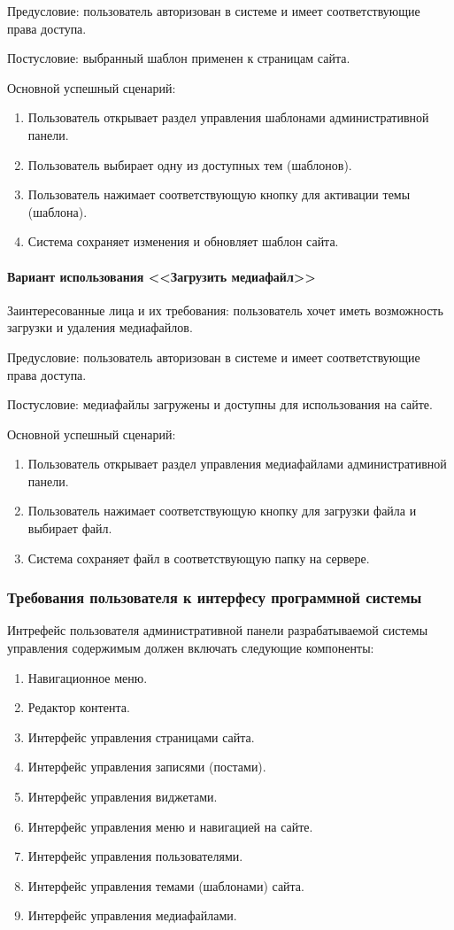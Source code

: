 Предусловие: пользователь авторизован в системе и имеет соответствующие права доступа.

Постусловие: выбранный шаблон применен к страницам сайта.

Основной успешный сценарий:
\begin{enumerate}
	\item Пользователь открывает раздел управления шаблонами административной панели.
	\item Пользователь выбирает одну из доступных тем (шаблонов).
	\item Пользователь нажимает соответствующую кнопку для активации темы (шаблона).
	\item Система сохраняет изменения и обновляет шаблон сайта.
\end{enumerate}

\paragraph{Вариант использования <<Загрузить медиафайл>>}
Заинтересованные лица и их требования: пользователь хочет иметь возможность загрузки и удаления медиафайлов.

Предусловие: пользователь авторизован в системе и имеет соответствующие права доступа.

Постусловие: медиафайлы загружены и доступны для использования на сайте.

Основной успешный сценарий:
\begin{enumerate}
	\item Пользователь открывает раздел управления медиафайлами административной панели.
	\item Пользователь нажимает соответствующую кнопку для загрузки файла и выбирает файл.
	\item Система сохраняет файл в соответствующую папку на сервере.
\end{enumerate}

\subsubsection{Требования пользователя к интерфесу программной системы} \label{interface_requirements}
Интрефейс пользователя административной панели разрабатываемой системы управления содержимым должен включать следующие компоненты:
\begin{enumerate}
	\item Навигационное меню.
	\item Редактор контента.
	\item Интерфейс управления страницами сайта.
	\item Интерфейс управления записями (постами).
	\item Интерфейс управления виджетами.
	\item Интерфейс управления меню и навигацией на сайте.
	\item Интерфейс управления пользователями.
	\item Интерфейс управления темами (шаблонами) сайта.
	\item Интерфейс управления медиафайлами.
\end{enumerate}


